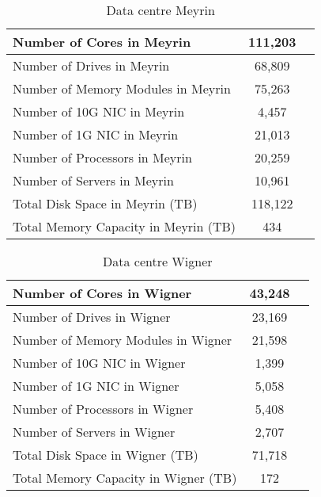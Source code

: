 \begin{table}[H]
    \begin{center}
    \begin{tabular}{|l|c|c}
        \hline
        Number of Cores in Meyrin & 111,203\\
        \hline
        Number of Drives in Meyrin & 68,809\\
        \hline
        Number of Memory Modules in Meyrin & 75,263\\
        \hline
        Number of 10G NIC in Meyrin & 4,457\\
        \hline
        Number of 1G NIC in Meyrin & 21,013\\
        \hline
        Number of Processors in Meyrin & 20,259\\
        \hline
        Number of Servers in Meyrin & 10,961\\
        \hline
        Total Disk Space in Meyrin (TB) & 118,122\\
        \hline
        Total Memory Capacity in Meyrin (TB) & 434\\
        \hline
    \end{tabular}
    \caption[]{Data centre Meyrin}
    \vspace{2em}
    \end{center}
\end{table}
\begin{table}[H]
    \begin{center}
    \begin{tabular}{|l|c|c}
        \hline
        Number of Cores in Wigner & 43,248\\
        \hline
        Number of Drives in Wigner & 23,169\\
        \hline
        Number of Memory Modules in Wigner & 21,598\\
        \hline
        Number of 10G NIC in Wigner & 1,399\\
        \hline
        Number of 1G NIC in Wigner & 5,058\\
        \hline
        Number of Processors in Wigner & 5,408\\
        \hline
        Number of Servers in Wigner & 2,707\\
        \hline
        Total Disk Space in Wigner (TB) & 71,718\\
        \hline
        Total Memory Capacity in Wigner (TB) & 172\\
        \hline
    \end{tabular}
    \caption[]{Data centre Wigner}
    \vspace{2em}
    \end{center}
\end{table}
